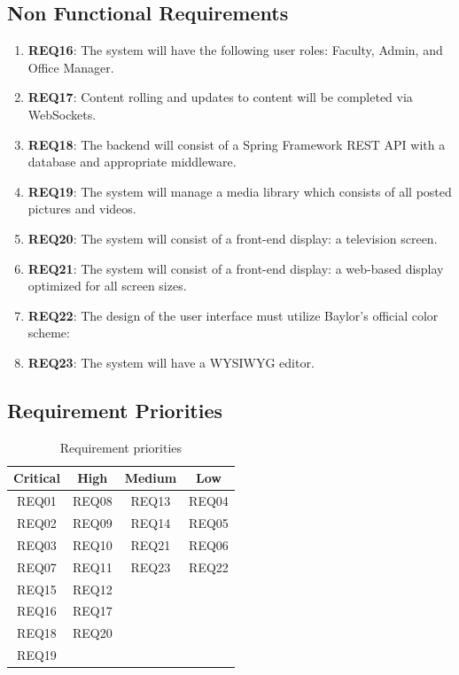 \documentclass{article}
\begin{document}
\subsection{Non Functional Requirements}
\begin{enumerate}
    \item \textbf{REQ16}: The system will have the following user roles: Faculty, Admin, and Office Manager.
    \item \textbf{REQ17}: Content rolling and updates to content will be completed via WebSockets.
    \item \textbf{REQ18}: The backend will consist of a Spring Framework REST API with a database and appropriate middleware.
    \item \textbf{REQ19}:  The system will manage a media library which consists of all posted pictures and videos.
    \item \textbf{REQ20}: The system will consist of a front-end display: a television screen.
    \item \textbf{REQ21}: The system will consist of a front-end display: a web-based display optimized for all screen sizes.
    \item \textbf{REQ22}:  The design of the user interface must utilize Baylor’s official color scheme:
    \item \textbf{REQ23}: The system will have a WYSIWYG editor.
\end{enumerate}
\subsection{Requirement Priorities}

\begin{table}[H]
    \centering
    \begin{tabular}{| c | c | c | c |}
    \hline
        \textbf{Critical} & \textbf{High} & \textbf{Medium} & \textbf{Low}\\
        \hline
         REQ01 & REQ08 & REQ13 & REQ04 \\
         REQ02 & REQ09 & REQ14 & REQ05 \\
         REQ03 & REQ10 & REQ21 & REQ06 \\
         REQ07 & REQ11 & REQ23 & REQ22 \\
         REQ15 & REQ12 &  & \\
         REQ16 & REQ17 &  & \\
         REQ18 & REQ20 &  & \\
         REQ19 &  &  & \\
    \hline
    \end{tabular}
    \caption{Requirement priorities}
    \label{tab:my_label}
\end{table}
\end{document}
